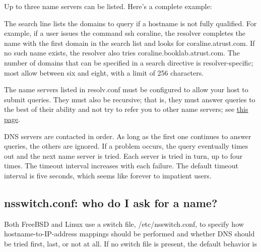 
Up to three name servers can be listed. Here's a complete
example:\protect\hypertarget{part0024_split_005.htmlux5cux23_idIndexMarker1979}{}{}\protect\hypertarget{part0024_split_005.htmlux5cux23_idIndexMarker1980}{}{}


The {search} line lists the domains to query if a hostname is not fully
qualified. For example, if a user issues the command {ssh} {coraline},
the resolver completes the name with the first domain in the search list
and looks for coraline.atrust.com. If no such name exists, the resolver
also tries coraline.booklab.atrust.com. The number of domains that can
be specified in a {search} directive is resolver-specific; most allow
between six and eight, with a limit of 256 characters.

The name servers listed in {resolv.conf} must be configured to allow
your host to submit queries. They must also be recursive; that is, they
must answer queries to the best of their ability and not try to refer
you to other name servers; see
\protect\hyperlink{part0024_split_013.htmlux5cux23_idTextAnchor857}{this
page}.

DNS servers are contacted in order. As long as the first one continues
to answer queries, the others are ignored. If a problem occurs, the
query eventually times out and the next name server is tried. Each
server is tried in turn, up to four times. The timeout interval
increases with each failure. The default timeout interval is five
seconds, which seems like forever to impatient users.

\protect\hypertarget{part0024_split_006.html}{}{}

\hypertarget{part0024_split_006.htmlux5cux23_idContainer1069}{}
\hypertarget{part0024_split_006.htmlux5cux23calibre_pb_5}{%
\subsection[: who do I ask for a
name?]{\texorpdfstring{{\protect\hypertarget{part0024_split_006.htmlux5cux23_idTextAnchor848}{}{}nsswitch.conf}:
who do I ask for a
name?}{nsswitch.conf: who do I ask for a name?}}\label{part0024_split_006.htmlux5cux23calibre_pb_5}}

\protect\hypertarget{part0024_split_006.htmlux5cux23_idIndexMarker1981}{}{}Both
FreeBSD and Linux use a switch file,
\protect\hypertarget{part0024_split_006.htmlux5cux23_idIndexMarker1982}{}{}\protect\hypertarget{part0024_split_006.htmlux5cux23_idIndexMarker1983}{}{}{/etc/nsswitch.conf,}
to specify how hostname-to-IP-address mappings should be performed and
whether DNS should be tried first, last, or not at all. If no switch
file is present, the default behavior is

